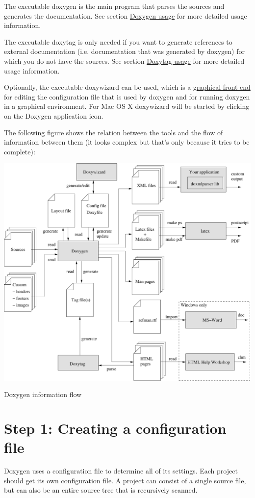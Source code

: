 The executable {\ttfamily doxygen} is the main program that parses the sources and generates the documentation. See section \hyperlink{doxygen_usage}{Doxygen usage} for more detailed usage information.

The executable {\ttfamily doxytag} is only needed if you want to generate references to external documentation (i.e. documentation that was generated by doxygen) for which you do not have the sources. See section \hyperlink{doxytag_usage}{Doxytag usage} for more detailed usage information.

Optionally, the executable {\ttfamily doxywizard} can be used, which is a \hyperlink{doxywizard_usage}{graphical front-\/end} for editing the configuration file that is used by doxygen and for running doxygen in a graphical environment. For Mac OS X doxywizard will be started by clicking on the Doxygen application icon.

The following figure shows the relation between the tools and the flow of information between them (it looks complex but that's only because it tries to be complete):

 
\begin{DoxyImage}
\includegraphics[width=14cm]{infoflow}
\caption{Doxygen information flow}
\end{DoxyImage}
\hypertarget{starting_step1}{}\section{Step 1: Creating a configuration file}\label{starting_step1}
Doxygen uses a configuration file to determine all of its settings. Each project should get its own configuration file. A project can consist of a single source file, but can also be an entire source tree that is recursively scanned.

